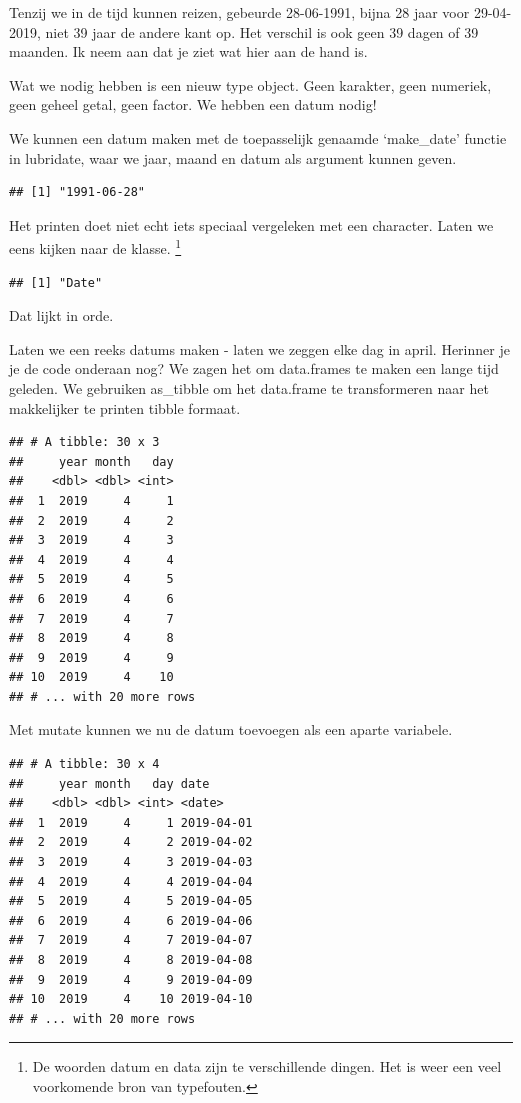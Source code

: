 \documentclass[]{tufte-book}
\begin{document}
Tenzij we in de tijd kunnen reizen, gebeurde 28-06-1991, bijna 28 jaar voor 29-04-2019, niet 39 jaar de andere kant op. Het verschil is ook geen 39 dagen of 39 maanden. Ik neem aan dat je ziet wat hier aan de hand is.

Wat we nodig hebben is een nieuw type object. Geen karakter, geen numeriek, geen geheel getal, geen factor. We hebben een datum nodig!

We kunnen een datum maken met de toepasselijk genaamde `make\_date' functie in lubridate, waar we jaar, maand en datum als argument kunnen geven.

\begin{verbatim}
## [1] "1991-06-28"
\end{verbatim}

Het printen doet niet echt iets speciaal vergeleken met een character. Laten we eens kijken naar de klasse. \footnote{De woorden datum en data zijn te verschillende dingen. Het is weer een veel voorkomende bron van typefouten.}

\begin{verbatim}
## [1] "Date"
\end{verbatim}

Dat lijkt in orde.

Laten we een reeks datums maken - laten we zeggen elke dag in april. Herinner je je de code onderaan nog? We zagen het om data.frames te maken een lange tijd geleden. We gebruiken as\_tibble om het data.frame te transformeren naar het makkelijker te printen tibble formaat.

\begin{verbatim}
## # A tibble: 30 x 3
##     year month   day
##    <dbl> <dbl> <int>
##  1  2019     4     1
##  2  2019     4     2
##  3  2019     4     3
##  4  2019     4     4
##  5  2019     4     5
##  6  2019     4     6
##  7  2019     4     7
##  8  2019     4     8
##  9  2019     4     9
## 10  2019     4    10
## # ... with 20 more rows
\end{verbatim}

Met mutate kunnen we nu de datum toevoegen als een aparte variabele.

\begin{verbatim}
## # A tibble: 30 x 4
##     year month   day date      
##    <dbl> <dbl> <int> <date>    
##  1  2019     4     1 2019-04-01
##  2  2019     4     2 2019-04-02
##  3  2019     4     3 2019-04-03
##  4  2019     4     4 2019-04-04
##  5  2019     4     5 2019-04-05
##  6  2019     4     6 2019-04-06
##  7  2019     4     7 2019-04-07
##  8  2019     4     8 2019-04-08
##  9  2019     4     9 2019-04-09
## 10  2019     4    10 2019-04-10
## # ... with 20 more rows
\end{verbatim}
\end{document}
